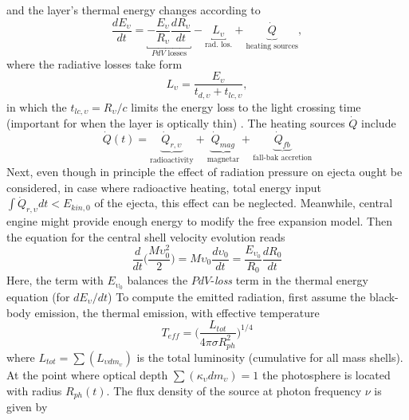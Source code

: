 %
and the layer's thermal energy changes according to 
%
\begin{equation}
\label{eq:theory:mkn:energ}
\frac{dE_{\upsilon}}{dt} = \underbracket{-\frac{E_{\upsilon}}{R_{\upsilon}} \frac{dR_{\upsilon}}{dt}}_{PdV\text{ losses}} - \underbracket{L_{\upsilon}}_{\text{rad. los.}} + \underbrace{\dot{Q}}_{\text{heating sources}},
\end{equation}
%
where the radiative losses take form
%
\begin{equation}
L_{\upsilon} = \frac{E_{\upsilon}}{t_{d,\upsilon} + t_{lc,\upsilon}},
\end{equation}
%
in which the $t_{lc,\upsilon} = R_{\upsilon}/c$ limits the energy loss to the 
light crossing time (important for when the layer is optically thin) .
%
The heating sources $\dot{Q}$ include
%
\begin{equation}
\dot{Q}(t) = \underbrace{\dot{Q}_{r,\upsilon}}_{\text{radioactivity}} + \underbrace{\dot{Q}_{mag}}_{\text{magnetar}} + \underbrace{\dot{Q}_{fb}}_{\text{fall-bak accretion}}
\end{equation}
%
Next, even though in principle the effect of radiation pressure on ejecta ought be considered, 
in case where radioactive heating, total energy input $\int \dot{Q}_{r,\upsilon}dt < E_{kin,0}$ 
of the ejecta, \cite{Metzger:2010,Rosswog:2013kqa} %
this effect can be neglected.
Meanwhile, central engine might provide enough energy to modify the free expansion model. 
Then the equation for the central shell velocity evolution reads 
%
\begin{equation}
\label{eq:theory:mkn:velcenteng}
\frac{d}{dt}\Bigg(\frac{M\upsilon_0^2}{2}\Bigg) = M\upsilon_0\frac{d\upsilon_0}{dt} = \frac{E_{\upsilon_0}}{R_0}\frac{dR_0}{dt}
\end{equation}
%
Here, the term with $E_{\upsilon_0}$ balances the $PdV$-\textit{loss} term in the thermal 
energy equation (for $dE_{\upsilon}/dt$)
%
To compute the emitted radiation, first assume the black-body emission, 
the thermal emission, with effective temperature 
%
\begin{equation}
T_{eff} = \Bigg(\frac{L_{tot}}{4 \pi \sigma R_{ph}^2}\Bigg)^{1/4}
\end{equation}
%
where $L_{tot} = \sum(L_{\upsilon dm_{\upsilon}})$ is the total luminosity 
(cumulative for all mass shells). At the point where optical depth 
$\sum(\kappa_{\upsilon}dm_{\upsilon})=1$ the photosphere is located with radius $R_{ph}(t)$. 
%
The flux density of the source at photon frequency $\nu$ is given by 
